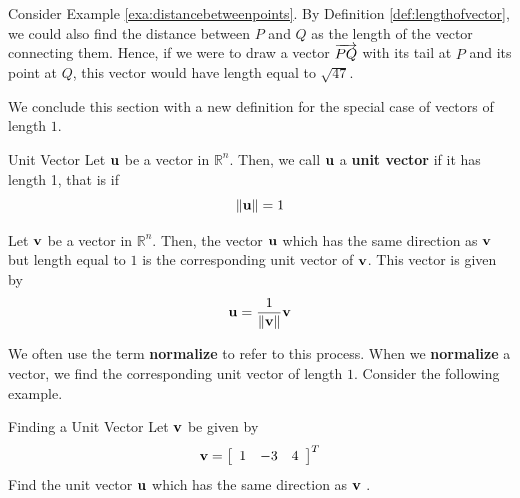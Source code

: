 Consider Example \ref{exa:distancebetweenpoints}. By Definition \ref{def:lengthofvector}, we could also find the distance between $P$ and $Q$ 
as the length of the vector connecting them. Hence, if we were to draw a vector $\overrightarrow{PQ}$ 
with its tail at $P$ and its point at $Q$, this vector would have length equal to 
$\sqrt{47}$.

We conclude this section with a new definition for the special case of
vectors of length $1$.

\begin{definition}{Unit Vector}\label{def:unitvector}
Let $\mathbf{u}$ be a vector in $\mathbb{R}^{n}$. Then, we call $\mathbf{u}$ a 
\textbf{unit vector}  if it has length 1, that is if
\begin{equation*}
\| \mathbf{u} \|
=
1
\end{equation*}
\end{definition}

Let $\mathbf{v}$ be a vector in $\mathbb{R}^{n}$. Then, the vector $\mathbf{u}$
which has the same direction as $\mathbf{v}$ but length equal to $1$ is the corresponding unit vector of $\mathbf{v}$. 
This vector is given by
\begin{equation*}
\mathbf{u}
=
\frac{1}{\| \mathbf{v} \|}
\mathbf{v}
\end{equation*}

We often use the term \textbf{normalize} to refer to this process. When we \textbf{normalize} a vector, we find the corresponding unit vector of length $1$. 
Consider the following example.

\begin{example}{Finding a Unit Vector}\label{exa:unitvector}
Let $\mathbf{v}$ be given by 
\begin{equation*}
\mathbf{v}
=
\left[
\begin{array}{rrr}
1 & -3 & 4
\end{array}
\right]^T
\end{equation*}
Find the unit vector $\mathbf{u}$ which has the same direction as $\mathbf{v}$ .
\end{example}


